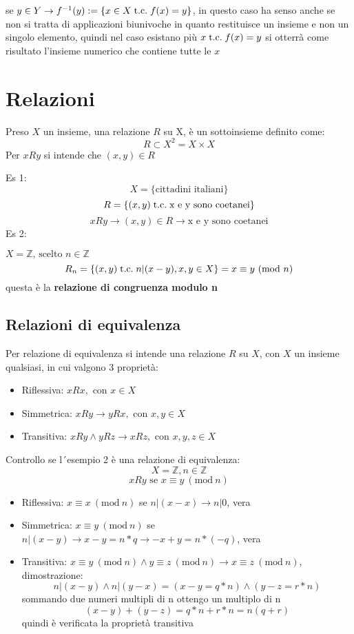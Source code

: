 \documentclass[a4paper,12pt]{article}
\newcommand{\rel}[1][R]{R}
\newcommand{\Mod}[1]{\ (\mathrm{mod}\ #1)}
\begin{document}
	se $y \in Y \rightarrow f^{-1}(y) := \{x \in X \;\text{t.c.}\; f(x) = y\}$, in questo caso ha senso anche se non si tratta di applicazioni biunivoche in quanto restituisce un insieme e non un singolo elemento, quindi nel caso esistano più $x \;\text{t.c.}\; f(x) = y$ si otterrà come risultato l'insieme numerico che contiene tutte le $x$
	
	\section{Relazioni}
	Preso $X$ un insieme, una relazione $\rel$ su X, è un sottoinsieme definito come: \[\rel \subset X^2 = X \times X\]
	Per $x \rel y$ si intende che $(x, y)\in \rel$
	
	Es 1: 
	\[X = \{\text{cittadini italiani}\}\]
	\[\rel = \{(x, y) \tc \text{x e y sono coetanei}\}\]
	\[x\rel y \rightarrow (x,y) \in \rel \rightarrow \text{x e y sono coetanei}\]
	Es 2:
	
	$X = \mathbb{Z} \text{, scelto } n \in \mathbb{Z}$
	\[
	\rel_n = \{(x, y) \tc n|(x - y), x,y \in X\} = x \equiv y \Mod{n}
	\]
	questa è la \textbf{relazione di congruenza modulo n}
	
	\subsection{Relazioni di equivalenza}
	Per relazione di equivalenza si intende una relazione $\rel$ su $X$, con $X$ un insieme qualsiasi, in cui valgono 3 proprietà:
	\begin{itemize}
		\item Riflessiva: $x \rel x, \text{ con } x \in X$
		\item Simmetrica: $x \rel y \rightarrow y \rel x, \text{ con } x,y \in X$
		\item Transitiva: $x \rel y \wedge y \rel z \rightarrow x \rel z, \text{ con } x,y,z \in X$
	\end{itemize}
	Controllo se l´esempio 2 è una relazione di equivalenza:
	\[
	X = \mathbb{Z}, n\in \mathbb{Z}
	\]
	\[
	x \rel y \text{ se } x \equiv y \Mod n
	\]
	\begin{itemize}
		\item Riflessiva: $x \equiv x \Mod n$ se $n|(x - x) \rightarrow n|0$, vera
		\item Simmetrica: $x \equiv y \Mod n$ se $n|(x - y) \rightarrow x-y = n*q \rightarrow -x + y = n * (-q)$, vera
		\item Transitiva: $x \equiv y \Mod n \wedge y \equiv z \Mod n \rightarrow x \equiv z \Mod{n}$, dimostrazione:
		\[
		n|(x-y) \wedge n|(y - x) = (x - y = q * n) \wedge (y - z = r * n)
		\]
		sommando due numeri multipli di n ottengo un multiplo di n
		\[
		(x -y) + (y -z) = q * n + r * n = n (q+r)
		\]
		quindi è verificata la proprietà transitiva
	\end{itemize}
	
\end{document}
